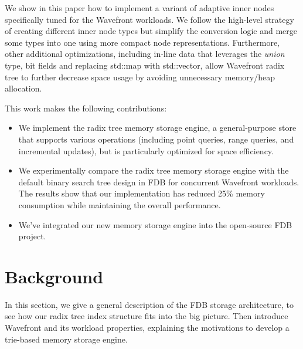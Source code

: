 \documentclass[sigplan,screen,nonacm]{acmart}
\begin{document}
We show in this paper how to implement a variant of adaptive inner nodes specifically tuned for the Wavefront workloads. We follow the high-level strategy of creating different inner node types but simplify the conversion logic and merge some types into one using more compact node representations. Furthermore, other additional optimizations, including in-line data that leverages the {\itshape union} type, bit fields  \cite{oualline1997practical} and replacing std::map with std::vector, allow Wavefront radix tree to further decrease space usage by avoiding unnecessary memory/heap allocation. 

This work makes the following contributions:
\begin{itemize}
\item We implement the radix tree memory storage engine, a general-purpose store that supports various operations (including point queries, range queries, and incremental updates), but is particularly optimized for space efficiency. 
\item We experimentally compare the radix tree memory storage engine with the default binary search tree design in FDB for concurrent Wavefront workloads. The results show that our implementation has reduced 25\% memory consumption while maintaining the overall performance. 
\item We’ve integrated our new memory storage engine into the open-source FDB project.
\end{itemize}

\section{Background}
In this section, we give a general description of the FDB storage architecture, to see how our radix tree index structure fits into the big picture. Then introduce Wavefront and its workload properties, explaining the motivations to develop a trie-based memory storage engine. 
\end{document}
